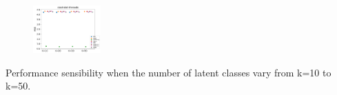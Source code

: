 \begin{subfigure}                                                           
         \centering                                                         
      \includegraphics[width=0.23\textwidth]{fig2/slashdot_wsim_evo2__}
\end{subfigure}                                                             
\caption{Performance sensibility when the number of latent classes vary from k=10 to k=50.}
